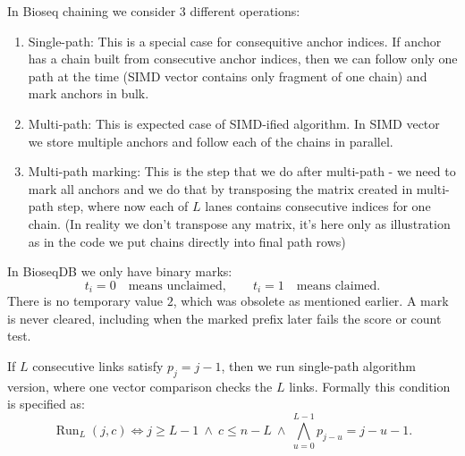 In Bioseq chaining we consider 3 different operations:
\begin{enumerate}
  \item Single-path: This is a special case for consequitive anchor indices. If anchor has a chain built from consecutive anchor indices, then we can follow only one path at the time (SIMD vector contains only fragment of one chain) and mark anchors in bulk.
  \item Multi-path: This is expected case of SIMD-ified algorithm. In SIMD vector we store multiple anchors and follow each of the chains in parallel.
  \item Multi-path marking: This is the step that we do after multi-path - we need to mark all anchors and we do that by transposing the matrix created in multi-path step, where now each of $L$ lanes contains consecutive indices for one chain. (In reality we don't transpose any matrix, it's here only as illustration as in the code we put chains directly into final path rows)
\end{enumerate}

In BioseqDB we only have binary marks:
\[
  t_i=0\quad\text{means unclaimed},\qquad
  t_i=1\quad\text{means claimed}.
\]
There is no temporary value \(2\), which was obsolete as mentioned earlier.  A mark is never cleared, including when
the marked prefix later fails the score or count test.

If \(L\) consecutive links satisfy \(p_j=j-1\), then we run single-path algorithm version, where one vector comparison checks the \(L\) links. Formally this condition is specified as:
\[
  \operatorname{Run}_L(j,c)\iff
  j\geq L-1\ \land\ c\leq n-L\ \land\
  \bigwedge_{u=0}^{L-1}p_{j-u}=j-u-1.
\]



